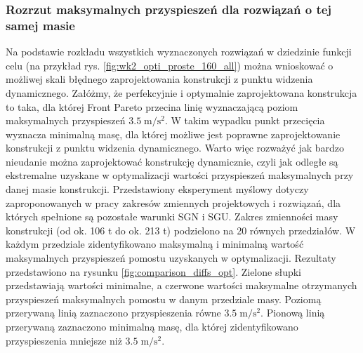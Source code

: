 \subsubsection{Rozrzut maksymalnych przyspieszeń dla rozwiązań o tej samej masie}
Na podstawie rozkładu wszystkich wyznaczonych rozwiązań w dziedzinie funkcji celu (na przykład rys. \ref{fig:wk2_opti_proste_160_all}) można wnioskować o możliwej skali błędnego zaprojektowania konstrukcji z punktu widzenia dynamicznego. Załóżmy, że perfekcyjnie i optymalnie zaprojektowana konstrukcja to taka, dla której Front Pareto przecina linię wyznaczającą poziom maksymalnych przyspieszeń $3.5\;\mathrm{m/s^2}$. W takim wypadku punkt przecięcia wyznacza minimalną masę, dla której możliwe jest poprawne zaprojektowanie konstrukcji z punktu widzenia dynamicznego. Warto więc rozważyć jak bardzo nieudanie można zaprojektować konstrukcję dynamicznie, czyli jak odległe są ekstremalne uzyskane w optymalizacji wartości przyspieszeń maksymalnych przy danej masie konstrukcji. Przedstawiony eksperyment myślowy dotyczy zaproponowanych w pracy zakresów zmiennych projektowych i rozwiązań, dla których spełnione są pozostałe warunki SGN i SGU. Zakres zmienności masy konstrukcji (od ok. 106 t do ok. 213 t) podzielono na 20 równych przedziałów. W każdym przedziale zidentyfikowano maksymalną i minimalną wartość maksymalnych przyspieszeń pomostu uzyskanych w optymalizacji. Rezultaty przedstawiono na rysunku \ref{fig:comparison_diffs_opt}. Zielone słupki przedstawiają wartości minimalne, a czerwone wartości maksymalne otrzymanych przyspieszeń maksymalnych pomostu w danym przedziale masy. Poziomą przerywaną linią zaznaczono przyspieszenia równe $3.5\;\mathrm{m/s^2}$. Pionową linią przerywaną zaznaczono minimalną masę, dla której zidentyfikowano przyspieszenia mniejsze niż $3.5\;\mathrm{m/s^2}$.

